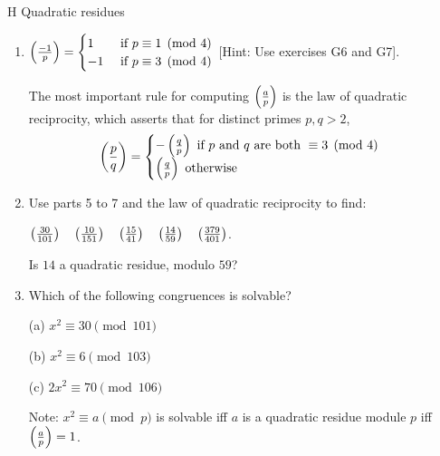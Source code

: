 \begin{exercise}{H Quadratic residues}
\begin{enumerate}
     (b) $\parens{\frac{a^{2}}{p}}=$\textcolor{blue}{1, [I assume, since the book has a typo]} if $p\not\vert a$.
     \item $\left( \frac{-1}{p}\right)=
     \begin{cases}
        1  &\text{ if}\ p\equiv 1\pmod{4}\\
        -1 &\text{ if}\ p\equiv 3\pmod{4}
     \end{cases}$
     [Hint: Use exercises G6 and G7].

     The most important rule for computing $\left( \frac{a}{p}\right)$ is the law of quadratic reciprocity, which asserts that for distinct primes $p,q>2$,
     \begin{align*}
        \left( \frac{p}{q}\right)=
            \begin{cases}
                -\left( \frac{q}{p}\right) \text{ if $p$ and $q$ are both }\equiv 3\pmod{4}\\
                \left( \frac{q}{p}\right) \text{ otherwise}
            \end{cases}
     \end{align*}
     \item Use parts 5 to 7 and the law of quadratic reciprocity to find:
     
     $\left( \frac{30}{101}\right)\quad \left( \frac{10}{151}\right)\quad \left( \frac{15}{41}\right)\quad \left( \frac{14}{59}\right)\quad \left( \frac{379}{401}\right)$.

     Is $14$ a quadratic residue, modulo $59$?
     \item Which of the following congruences is solvable? 

     (a) $x^{2}\equiv 30\pmod{101}$

     (b) $x^{2}\equiv 6\pmod{103}$

     (c) $2x^{2}\equiv 70\pmod{106}$

     Note: $x^{2}\equiv a\pmod{p}$ is solvable iff $a$ is a quadratic residue module $p$ iff $\left( \frac{a}{p}\right)=1$.
 \end{enumerate}
\end{exercise}
